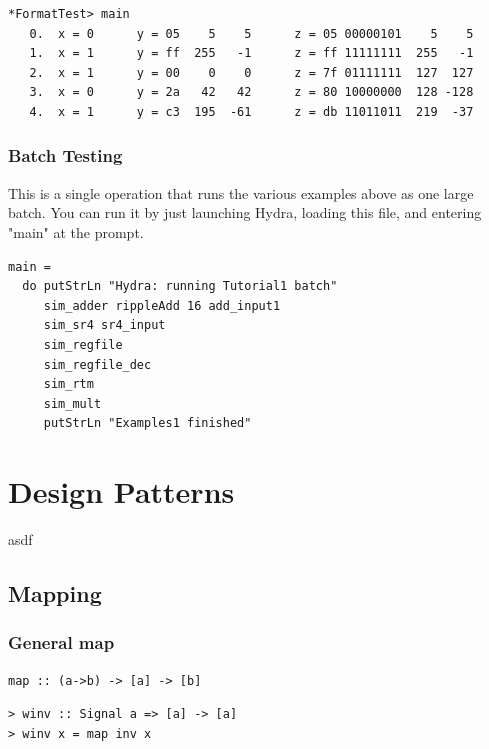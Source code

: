 \documentclass[a4paper,openany,fleqn]{book}
\begin{document}
\begin{verbatim}
*FormatTest> main
   0.  x = 0      y = 05    5    5      z = 05 00000101    5    5
   1.  x = 1      y = ff  255   -1      z = ff 11111111  255   -1
   2.  x = 1      y = 00    0    0      z = 7f 01111111  127  127
   3.  x = 0      y = 2a   42   42      z = 80 10000000  128 -128
   4.  x = 1      y = c3  195  -61      z = db 11011011  219  -37
\end{verbatim}

\subsection{Batch Testing}
\label{sec:batch-testing}

This is a single operation that runs the various examples above as one
large batch.  You can run it by just launching Hydra, loading this
file, and entering "main" at the prompt.

\begin{verbatim}
main =
  do putStrLn "Hydra: running Tutorial1 batch"
     sim_adder rippleAdd 16 add_input1
     sim_sr4 sr4_input
     sim_regfile
     sim_regfile_dec
     sim_rtm
     sim_mult
     putStrLn "Examples1 finished"
\end{verbatim}


\chapter{Design Patterns}
\label{sec:design-patterns}

asdf




\section{Mapping}
\label{sec:mapping}




\subsection{General map}
\label{sec:general-map}


\begin{verbatim}
map :: (a->b) -> [a] -> [b]
\end{verbatim}

\begin{verbatim}
> winv :: Signal a => [a] -> [a]
> winv x = map inv x
\end{verbatim}
\end{document}
